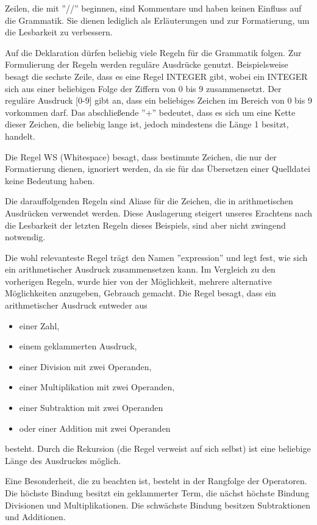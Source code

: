 Zeilen, die mit ''//'' beginnen, sind Kommentare und haben keinen Einfluss auf die Grammatik. Sie dienen lediglich als Erläuterungen und zur Formatierung, um die Lesbarkeit zu verbessern.

Auf die Deklaration dürfen beliebig viele Regeln für die Grammatik folgen. Zur Formulierung der Regeln werden reguläre Ausdrücke genutzt. Beispielsweise besagt die sechste Zeile, dass es eine Regel INTEGER gibt, wobei ein INTEGER sich aus einer beliebigen Folge der Ziffern von 0 bis 9 zusammensetzt. Der reguläre Ausdruck [0-9] gibt an, dass ein beliebiges Zeichen im Bereich von 0 bis 9 vorkommen darf. Das abschließende ''+'' bedeutet, dass es sich um eine Kette dieser Zeichen, die beliebig lange ist, jedoch mindestens die Länge 1 besitzt, handelt.

Die Regel WS (Whitespace) besagt, dass bestimmte Zeichen, die nur der Formatierung dienen, ignoriert werden, da sie für das Übersetzen einer Quelldatei keine Bedeutung haben.

Die darauffolgenden Regeln sind Aliase für die Zeichen, die in arithmetischen Ausdrücken verwendet werden. Diese Auslagerung steigert unseres Erachtens nach die Lesbarkeit der letzten Regeln dieses Beispiels, sind aber nicht zwingend notwendig.

Die wohl relevanteste Regel trägt den Namen ''expression'' und legt fest, wie sich ein arithmetischer Ausdruck zusammensetzen kann. Im Vergleich zu den vorherigen Regeln, wurde hier von der Möglichkeit, mehrere alternative Möglichkeiten anzugeben, Gebrauch gemacht. Die Regel besagt, dass ein arithmetischer Ausdruck entweder aus 
\begin{itemize}
\item einer Zahl,
\item einem geklammerten Ausdruck,
\item einer Division mit zwei Operanden,
\item einer Multiplikation mit zwei Operanden,
\item einer Subtraktion mit zwei Operanden
\item oder einer Addition mit zwei Operanden
\end{itemize}
besteht.
Durch die Rekursion (die Regel verweist auf sich selbst) ist eine beliebige Länge des Ausdruckes möglich.

Eine Besonderheit, die zu beachten ist, besteht in der Rangfolge der Operatoren. Die höchste Bindung besitzt ein geklammerter Term, die nächst höchste Bindung Divisionen und Multiplikationen. Die schwächste Bindung besitzen Subtraktionen und Additionen.

